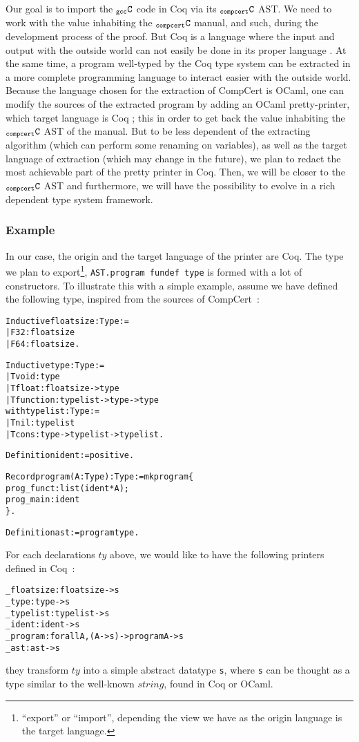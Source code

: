 \documentclass[a4paper, 11pt]{article}
\newenvironment{coq}
  {%
   \begin{alltt}
   \footnotesize} %% 8.3pl2 (April 2011)
  {\end{alltt} %
  }
\newcommand{\C}{$_{\tt compcert}{\tt C}$\xspace}
\newcommand{\gccC}{$_{\tt gcc}{\tt C}$\xspace}
\newcommand{\outworld}{the outside world\xspace}
\begin{document}
Our goal is to import the \gccC code in Coq via its \C AST. We need to work with the value inhabiting the \C manual, and such, during the development process of the proof. But Coq is a language where the input and output with \outworld can not easily be done in its proper language%
. At the same time, a program well-typed by the Coq type system can be extracted in a more complete programming language to interact easier with \outworld. Because the language chosen for the extraction of CompCert is OCaml, one can modify the sources of the extracted program by adding an OCaml pretty-printer, which target language is Coq ; this in order to get back the value inhabiting the \C AST of the manual. But to be less dependent of the extracting algorithm (which can perform some renaming on variables), as well as the target language of extraction (which may change in the future), we plan to redact the most achievable part of the pretty printer in Coq. Then, we will be closer to the \C AST and furthermore, we will have the possibility to evolve in a rich dependent type system framework. 
\subsubsection{Example}
In our case, the origin and the target language of the printer are Coq. The type we plan to export\footnote{``export'' or ``import'', depending the view we have as the origin language is the target language.}, \verb|AST.program fundef type| is formed with a lot of constructors. To illustrate this with a simple example, assume we have defined the following type, inspired from the sources of CompCert~:
\begin{coq}
Inductive floatsize : Type :=
  | F32: floatsize
  | F64: floatsize.

Inductive type : Type :=
  | Tvoid : type
  | Tfloat: floatsize -> type
  | Tfunction: typelist -> type -> type
with typelist : Type :=
  | Tnil : typelist
  | Tcons : type -> typelist -> typelist.

Definition ident := positive.

Record program (A : Type) : Type := mkprogram \{
  prog_funct : list (ident * A);
  prog_main : ident
\}.

Definition ast := program type.
\end{coq}
For each declarations $ty$ above, we would like to have the following printers defined in Coq~:
\begin{coq}
_floatsize : floatsize -> s
_type : type -> s
_typelist : typelist -> s
_ident : ident -> s
_program : forall A, (A -> s) -> program A -> s
_ast : ast -> s
\end{coq}
they transform $ty$ into a simple abstract datatype \verb|s|, where \verb|s| can be thought as a type similar to the well-known $string$, found in Coq or OCaml.
\end{document}
